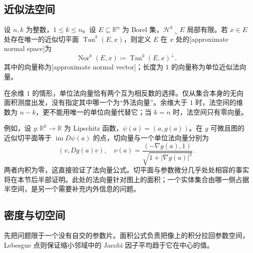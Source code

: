 \subsection{近似法空间}
\label{b1:subsec:190202}

\begin{definition}\label{b1:def:approximate-normal-space}
设 \(n,k\) 为整数，\(1\leq k\leq n\)。设 \(E\subseteq\mathbb R^n\) 为 Borel 集，\(\mathcal H^k\llcorner E\) 局部有限。若 \(x\in E\) 处存在唯一的近似切平面 \(\operatorname{Tan}^k(E,x)\)，则定义 \(E\) 在 \(x\) 处的[approximate normal space]为
\[
 \operatorname{Nor}^k(E,x)
 \coloneqq\operatorname{Tan}^k(E,x)^\perp.
\]
其中的向量称为[approximate normal vector]；长度为 \(1\) 的向量称为单位近似法向量。
\end{definition}

在余维 \(1\) 的情形，单位法向量恰有两个互为相反数的选择。仅从集合本身的无向面积测度出发，没有指定其中哪一个为“外法向量”。余维大于 \(1\) 时，法空间的维数为 \(n-k\)，更不能用唯一的单位向量代替它；当 \(k=n\) 时，法空间只有零向量。

\ProseParagraphBreak

例如，设 \(g:\mathbb R^k\rightarrow\mathbb R\) 为 Lipschitz 函数，\(\psi(a)=(a,g(a))\)。在 \(g\) 可微且图的近似切平面等于 \(\operatorname{im}D\psi(a)\) 的点，切向量与一个单位法向量分别为
\[
 (v,Dg(a)v),\quad
 \nu(a)=\frac{(-\nabla g(a),1)}
                    {\sqrt{1+|\nabla g(a)|^2}}.
\]
两者内积为零，这直接验证了法向量公式。切平面与参数微分几乎处处相容的事实将在本节后半部证明。此处的法向量针对图上的面积；一个实体集合由哪一侧占据半空间，是另一个需要补充内外信息的问题。

\subsection{密度与切空间}
\label{b1:subsec:190203}

先把问题限于一个没有自交的参数片。面积公式负责把像上的积分拉回参数空间，Lebesgue 点则保证缩小邻域中的 Jacobi 因子平均趋于它在中心的值。

